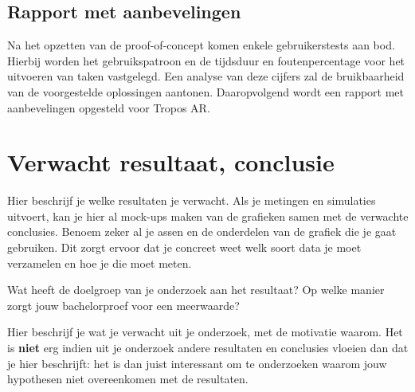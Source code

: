 \subsection{Rapport met aanbevelingen}
\label{subsec:result-of-poc}
Na het opzetten van de proof-of-concept komen enkele gebruikerstests aan bod. %
Hierbij worden het gebruikspatroon en de tijdsduur en foutenpercentage voor het uitvoeren van taken vastgelegd.
Een analyse van deze cijfers zal de bruikbaarheid van de voorgestelde oplossingen aantonen.
Daaropvolgend wordt een rapport met aanbevelingen opgesteld voor Tropos AR.

\section{Verwacht resultaat, conclusie}%
\label{sec:verwachte_resultaten}

Hier beschrijf je welke resultaten je verwacht. Als je metingen en simulaties uitvoert, kan je hier al mock-ups maken van de grafieken samen met de verwachte conclusies. Benoem zeker al je assen en de onderdelen van de grafiek die je gaat gebruiken. Dit zorgt ervoor dat je concreet weet welk soort data je moet verzamelen en hoe je die moet meten.

Wat heeft de doelgroep van je onderzoek aan het resultaat? Op welke manier zorgt jouw bachelorproef voor een meerwaarde?

Hier beschrijf je wat je verwacht uit je onderzoek, met de motivatie waarom. Het is \textbf{niet} erg indien uit je onderzoek andere resultaten en conclusies vloeien dan dat je hier beschrijft: het is dan juist interessant om te onderzoeken waarom jouw hypothesen niet overeenkomen met de resultaten.


